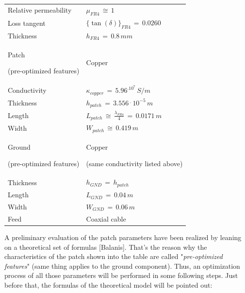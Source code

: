 \documentclass[12pt,a4paper]{article}
\begin{document}
{\begin{table}[h]
\begin{center}
{\begin{tabular}{||m{5cm}|m{5cm}||}
	Relative permeability & $\mu_{FR4}\,\cong\,1$\\

	Loss tangent & $\{\tan(\delta)\}_{FR4}\,=\,0.0260$\\

	Thickness & $h_{FR4}\,=\,0.8\,mm$\\
	\hline
\cellcolor{pink} Patch

(pre-optimized features) & \cellcolor{pink} Copper \\
\hline
%	
Conductivity & $\kappa_{copper}\,=\,5.96^.10^7\,S/m$ \\

Thickness & $h_{patch}\,=\,3.556\,^.\,10^{-5}\,m$\\

Length & $L_{patch}\,\cong\,\frac{\lambda_{FR4}}{4}\,=\,0.0171\,m$\\

Width & $W_{patch}\,\cong\,0.419\,m$\\

	\hline
\cellcolor{pink}Ground 

(pre-optimized features)
& \cellcolor{pink} Copper

(same conductivity listed above) \\
\hline
Thickness & $h_{GND}\,=\,h_{patch}$
\\
Length & $L_{GND}\,=\,0.04\,m$\\
Width & $W_{GND}\,=\,0.06\,m$\\
\hline
\cellcolor{pink}Feed & \cellcolor{pink} Coaxial cable \\
\hline
\end{tabular}}
\end{center}
\end{table}
A preliminary evaluation of the patch parameters have been realized by leaning on a theoretical set of formulas [Balanis]. That's the reason why the characteristics of the patch shown into the table are called "\emph{pre-optimized features}" (same thing applies to the ground component). Thus, an optimization process of all those parameters will be performed in some following steps. Just before that, the formulas of the theoretical model will be pointed out:

}
\end{document}

